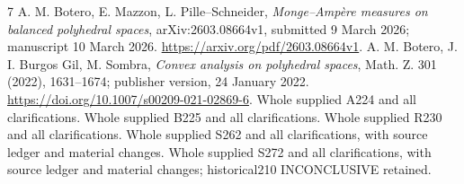 \documentclass[11pt]{article}
\begin{document}
\begin{thebibliography}{7}
 A. M. Botero, E. Mazzon, L. Pille--Schneider,
\emph{Monge--Amp\`ere measures on balanced polyhedral spaces},
arXiv:2603.08664v1, submitted 9 March 2026; manuscript 10 March 2026.
\url{https://arxiv.org/pdf/2603.08664v1}.
 A. M. Botero, J. I. Burgos Gil, M. Sombra,
\emph{Convex analysis on polyhedral spaces}, Math. Z. 301 (2022),
1631--1674; publisher version, 24 January 2022.
\url{https://doi.org/10.1007/s00209-021-02869-6}.
 Whole supplied A224 and all clarifications.
 Whole supplied B225 and all clarifications.
 Whole supplied R230 and all clarifications.
 Whole supplied S262 and all clarifications, with source ledger and material changes.
 Whole supplied S272 and all clarifications, with source ledger and material changes; historical210 INCONCLUSIVE retained.
\end{thebibliography}
\end{document}
